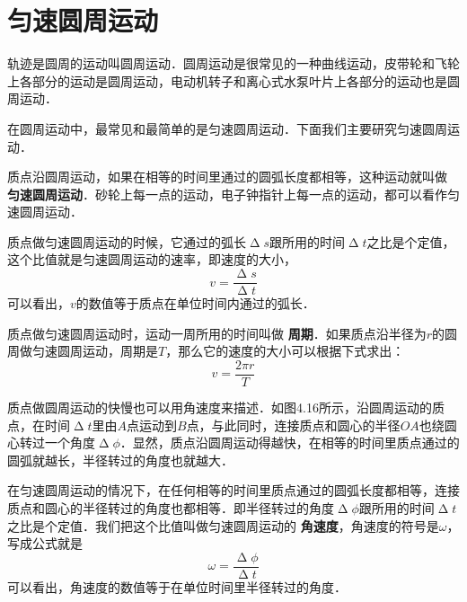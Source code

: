 \section{匀速圆周运动}

轨迹是圆周的运动叫圆周运动．圆周运动是很常见的一种曲线运动，皮带轮和飞轮上各部分的运动是圆周运动，电动机转子和离心式水泵叶片上各部分的运动也是圆周运动．

在圆周运动中，最常见和最简单的是匀速圆周运动．下面我们主要研究匀速圆周运动．

质点沿圆周运动，如果在相等的时间里通过的圆弧长度都相等，这种运动就叫做\textbf{ 匀速圆周运动}．砂轮上每一点的运动，电子钟指针上每一点的运动，都可以看作匀速圆周运动．

质点做匀速圆周运动的时候，它通过的弧长$\upDelta s$跟所用的时间$\upDelta t$之比是个定值，这个比值就是匀速圆周运动的速率，即速度的大小，
\[v=\frac{\upDelta s}{\upDelta t} \]
可以看出，$v$的数值等于质点在单位时间内通过的弧长．

质点做匀速圆周运动时，运动一周所用的时间叫做\textbf{ 周期}．如果质点沿半径为$r$的圆周做匀速圆周运动，周期是$T$，那么它的速度的大小可以根据下式求出：
\begin{equation}
    v=\frac{2\pi r}{T}
\end{equation}

质点做圆周运动的快慢也可以用角速度来描述．如图4.16所示，沿圆周运动的质点，在时间$\upDelta t$里由$A$点运动到$B$点，与此同时，连接质点和圆心的半径$OA$也绕圆心转过一个角度$\upDelta \phi$．显然，质点沿圆周运动得越快，在相等的时间里质点通过的圆弧就越长，半径转过的角度也就越大．
\begin{figure}[H]
    \centering
    \caption{}
\end{figure}

在匀速圆周运动的情况下，在任何相等的时间里质点通过的圆弧长度都相等，连接质点和圆心的半径转过的角度也都相等．即半径转过的角度$\upDelta \phi$跟所用的时间$\upDelta t$之比是个定值．我们把这个比值叫做匀速圆周运动的\textbf{ 角速度}，角速度的符号是$\omega$，写成公式就是
\begin{equation}
    \omega=\frac{\upDelta \phi}{\upDelta t}
\end{equation}
可以看出，角速度的数值等于在单位时间里半径转过的角度．

